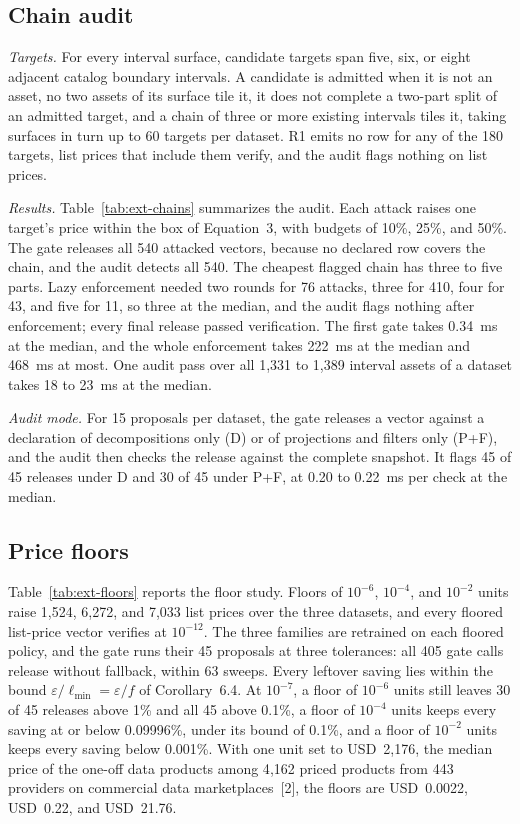 \documentclass[10pt]{article}
\newcommand{\tol}{\varepsilon}
\begin{document}


\subsection{Chain audit}
\emph{Targets.} For every interval surface, candidate targets span five, six, or eight adjacent catalog boundary intervals. A candidate is admitted when it is not an asset, no two assets of its surface tile it, it does not complete a two-part split of an admitted target, and a chain of three or more existing intervals tiles it, taking surfaces in turn up to 60 targets per dataset. R1 emits no row for any of the 180 targets, list prices that include them verify, and the audit flags nothing on list prices.

\emph{Results.} Table~\ref{tab:ext-chains} summarizes the audit. Each attack raises one target's price within the box of Equation~3, with budgets of 10\%, 25\%, and 50\%. The gate releases all 540 attacked vectors, because no declared row covers the chain, and the audit detects all 540. The cheapest flagged chain has three to five parts. Lazy enforcement needed two rounds for 76 attacks, three for 410, four for 43, and five for 11, so three at the median, and the audit flags nothing after enforcement; every final release passed verification. The first gate takes 0.34~ms at the median, and the whole enforcement takes 222~ms at the median and 468~ms at most. One audit pass over all 1{,}331 to 1{,}389 interval assets of a dataset takes 18 to 23~ms at the median.

\emph{Audit mode.} For 15 proposals per dataset, the gate releases a vector against a declaration of decompositions only (D) or of projections and filters only (P+F), and the audit then checks the release against the complete snapshot. It flags 45 of 45 releases under D and 30 of 45 under P+F, at 0.20 to 0.22~ms per check at the median.



\subsection{Price floors}
\label{sec:ext-floors}
Table~\ref{tab:ext-floors} reports the floor study. Floors of $10^{-6}$, $10^{-4}$, and $10^{-2}$ units raise 1{,}524, 6{,}272, and 7{,}033 list prices over the three datasets, and every floored list-price vector verifies at $10^{-12}$. The three families are retrained on each floored policy, and the gate runs their 45 proposals at three tolerances: all 405 gate calls release without fallback, within 63 sweeps. Every leftover saving lies within the bound $\tol/\ell_{\min} = \tol/f$ of Corollary~6.4. At $10^{-7}$, a floor of $10^{-6}$ units still leaves 30 of 45 releases above 1\% and all 45 above 0.1\%, a floor of $10^{-4}$ units keeps every saving at or below 0.09996\%, under its bound of 0.1\%, and a floor of $10^{-2}$ units keeps every saving below 0.001\%. With one unit set to USD~2{,}176, the median price of the one-off data products among 4{,}162 priced products from 443 providers on commercial data marketplaces~[2], the floors are USD~0.0022, USD~0.22, and USD~21.76.
\end{document}
